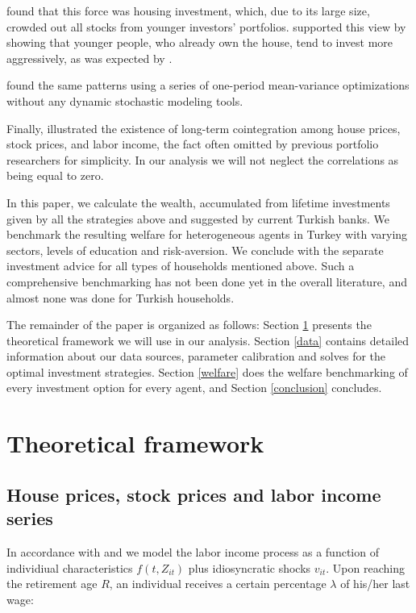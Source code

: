 \documentclass[]{elsarticle}
\begin{document}
\citet{cocco} found that this force was housing investment, which, due to its large size, crowded out all stocks from younger investors' portfolios. \citet{flavin} supported this view by showing that younger people, who already own the house, tend to invest more aggressively, as was expected by \citet{bodie}.

\citet{munk} found the same patterns using a series of one-period mean-variance optimizations without any dynamic stochastic modeling tools.

Finally, \citet{ascheberg} illustrated the existence of long-term cointegration among house prices, stock prices, and labor income, the fact often omitted by previous portfolio researchers for simplicity. In our analysis we will not neglect the correlations as being equal to zero. 

In this paper, we calculate the wealth, accumulated from lifetime investments given by all the strategies above and suggested by current Turkish banks. We benchmark the resulting welfare for heterogeneous agents in Turkey with varying sectors, levels of education and risk-aversion. We conclude with the separate investment advice for all types of households mentioned above. Such a comprehensive benchmarking has not been done yet in the overall literature, and almost none was done for Turkish households.

The remainder of the paper is organized as follows: Section \ref{model} presents the theoretical framework we will use in our analysis. Section \ref{data} contains detailed information about our data sources, parameter calibration and solves for the optimal investment strategies. Section \ref{welfare} does the welfare benchmarking of every investment option for every agent, and Section \ref{conclusion} concludes.


\section{Theoretical framework}
\label{model}

\subsection{House prices, stock prices and labor income series}
In accordance with \citet{ccgm} and \citet{olear} we model the labor income process as a function of individiual characteristics $f(t, Z_{it})$ plus idiosyncratic shocks $v_{it}$. Upon reaching the retirement age $R$, an individual receives a certain percentage $\lambda$ of his/her last wage:
\end{document}
